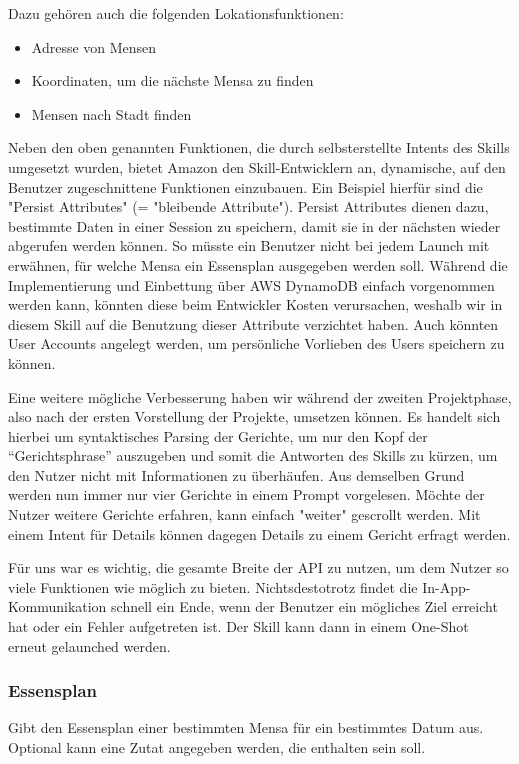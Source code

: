 \documentclass[12pt]{article}
\begin{document}
Dazu gehören auch die folgenden Lokationsfunktionen:
\begin{itemize}
	\setlength\itemsep{0em}
	\item Adresse von Mensen
	\item Koordinaten, um die nächste Mensa zu finden
	\item Mensen nach Stadt finden
\end{itemize}

Neben den oben genannten Funktionen, die durch selbsterstellte Intents des Skills umgesetzt wurden, bietet Amazon den Skill-Entwicklern an, dynamische, auf den Benutzer zugeschnittene Funktionen einzubauen. 
Ein Beispiel hierfür sind die "Persist Attributes" (= "bleibende Attribute").
Persist Attributes dienen dazu, bestimmte Daten in einer Session zu speichern, damit sie in der nächsten wieder abgerufen werden können.
So müsste ein Benutzer nicht bei jedem Launch mit erwähnen, für welche Mensa ein Essensplan ausgegeben werden soll.
Während die Implementierung und Einbettung über AWS DynamoDB einfach vorgenommen werden kann, könnten diese beim Entwickler Kosten verursachen, weshalb wir in diesem Skill auf die Benutzung dieser Attribute verzichtet haben.
Auch könnten User Accounts angelegt werden, um persönliche Vorlieben des Users speichern zu können. 

Eine weitere mögliche Verbesserung haben wir während der zweiten Projektphase, also nach der ersten Vorstellung der Projekte, umsetzen können.
Es handelt sich hierbei um syntaktisches Parsing der Gerichte, um nur den Kopf der “Gerichtsphrase” auszugeben und somit die Antworten des Skills zu kürzen, um den Nutzer nicht mit Informationen zu überhäufen.
Aus demselben Grund werden nun immer nur vier Gerichte in einem Prompt vorgelesen.
Möchte der Nutzer weitere Gerichte erfahren, kann einfach "weiter" gescrollt werden. Mit einem Intent für Details können dagegen Details zu einem Gericht erfragt werden.

Für uns war es wichtig, die gesamte Breite der API zu nutzen, um dem Nutzer so viele Funktionen wie möglich zu bieten.
Nichtsdestotrotz findet die In-App-Kommunikation schnell ein Ende, wenn der Benutzer ein mögliches Ziel erreicht hat oder ein Fehler aufgetreten ist.
Der Skill kann dann in einem One-Shot erneut gelaunched werden.

\subsubsection{Essensplan}
Gibt den Essensplan einer bestimmten Mensa für ein bestimmtes Datum aus. Optional kann eine Zutat angegeben werden, die enthalten sein soll. 
\end{document}
